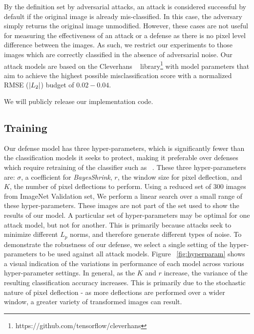 By the definition set by adversarial attacks, an attack is considered successful by default if the original image is already mis-classified. 
In this case, the adversary simply returns the original image unmodified. 
However, these cases are not useful for measuring the effectiveness of an attack or a defense as there is no pixel level difference between the images.
As such, we restrict our experiments to those images which are correctly classified in the absence of adversarial noise.
Our attack models are based on the Cleverhans  ~\cite{papernot2017cleverhans} library\footnote{https://github.com/tensorflow/cleverhans} with model parameters that aim to achieve the highest possible misclassification score with a normalized RMSE ($|\boldmath{L}_2|$) budget of $0.02-0.04$.

We will publicly release  our implementation code.

\subsection{Training}

Our defense model has three hyper-parameters, which is significantly fewer than the classification models it seeks to protect, making it preferable over defenses which require retraining of the classifier such as  ~\cite{Tramr2017TheSO,Meng2017MagNetAT}.
These three hyper-parameters are: $\sigma$, a coefficient for \textit{BayesShrink}, $r$, the window size for pixel deflection, and $K$, the number of pixel deflections to perform.
Using a reduced set of $300$ images from ImageNet Validation set, We perform a linear search over a small range of these hyper-parameters. 
These images are not part of the set used to show the results of our model.
A particular set of hyper-parameters may be optimal for one attack model, but not for another.  
This is primarily because attacks seek to minimize different $L_p$ norms, and therefore generate different types of noise.
To demonstrate the robustness of our defense, we select a single setting of the hyper-parameters to be used against all attack models.
Figure ~\ref{fig:hyperparam} shows a visual indication of the variations in performance of each model across various hyper-parameter settings. 
In general, as the $K$ and $r$ increase, the variance of the resulting classification accuracy increases.  
This is primarily due to the stochastic nature of pixel deflection - as more deflections are performed over a wider window, a greater variety of transformed images can result.


